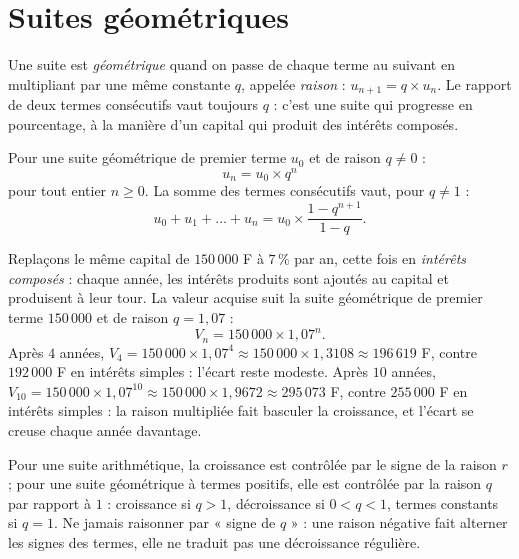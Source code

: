 \section{Suites géométriques}

\begin{definition}
Une suite est \emph{géométrique} quand on passe de chaque terme au suivant en multipliant par une même constante $q$, appelée \emph{raison} : $u_{n+1} = q \times u_{n}$. Le rapport de deux termes consécutifs vaut toujours $q$ : c'est une suite qui progresse en pourcentage, à la manière d'un capital qui produit des intérêts composés.
\end{definition}

\begin{propriete}
Pour une suite géométrique de premier terme $u_{0}$ et de raison $q \neq 0$ :
\[
u_{n} = u_{0} \times q^{n}
\]
pour tout entier $n \geqslant 0$. La somme des termes consécutifs vaut, pour $q \neq 1$ :
\[
u_{0} + u_{1} + \dots + u_{n} = u_{0} \times \frac{1 - q^{n+1}}{1 - q} .
\]
\end{propriete}

\begin{exemple}
Replaçons le même capital de $150\,000$ F à $7\,\%$ par an, cette fois en \emph{intérêts composés} : chaque année, les intérêts produits sont ajoutés au capital et produisent à leur tour. La valeur acquise suit la suite géométrique de premier terme $150\,000$ et de raison $q = 1{,}07$ :
\[
V_{n} = 150\,000 \times 1{,}07^{n} .
\]
Après $4$ années, $V_{4} = 150\,000 \times 1{,}07^{4} \approx 150\,000 \times 1{,}3108 \approx 196\,619$ F, contre $192\,000$ F en intérêts simples : l'écart reste modeste. Après $10$ années, $V_{10} = 150\,000 \times 1{,}07^{10} \approx 150\,000 \times 1{,}9672 \approx 295\,073$ F, contre $255\,000$ F en intérêts simples : la raison multipliée fait basculer la croissance, et l'écart se creuse chaque année davantage.
\end{exemple}

\begin{attention}
Pour une suite arithmétique, la croissance est contrôlée par le signe de la raison $r$ ; pour une suite géométrique à termes positifs, elle est contrôlée par la raison $q$ par rapport à $1$ : croissance si $q > 1$, décroissance si $0 < q < 1$, termes constants si $q = 1$. Ne jamais raisonner par « signe de $q$ » : une raison négative fait alterner les signes des termes, elle ne traduit pas une décroissance régulière.
\end{attention}

